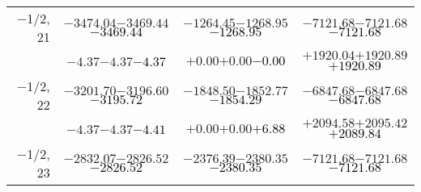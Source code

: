 \documentclass[compress]{beamer}
\begin{document}
\begin{frame}
{\begin{tabular}{r | c | c | c}
$-$1/2, 21 & $-3474.04$\hspace{0.1 cm}$-3469.44$\hspace{0.1 cm}\textcolor{black}{$-3469.44$} & $-1264.45$\hspace{0.1 cm}$-1268.95$\hspace{0.1 cm}\textcolor{black}{$-1268.95$} & $-7121.68$\hspace{0.1 cm}$-7121.68$\hspace{0.1 cm}\textcolor{black}{$-7121.68$} \\
           & $-4.37$\hspace{0.1 cm}$-4.37$\hspace{0.1 cm}\textcolor{black}{$-4.37$} & $+0.00$\hspace{0.1 cm}$+0.00$\hspace{0.1 cm}\textcolor{black}{$-0.00$} & $+1920.04$\hspace{0.1 cm}$+1920.89$\hspace{0.1 cm}\textcolor{black}{$+1920.89$} \\
$-$1/2, 22 & $-3201.70$\hspace{0.1 cm}$-3196.60$\hspace{0.1 cm}\textcolor{black}{$-3195.72$} & $-1848.50$\hspace{0.1 cm}$-1852.77$\hspace{0.1 cm}\textcolor{black}{$-1854.29$} & $-6847.68$\hspace{0.1 cm}$-6847.68$\hspace{0.1 cm}\textcolor{black}{$-6847.68$} \\
           & $-4.37$\hspace{0.1 cm}$-4.37$\hspace{0.1 cm}\textcolor{black}{$-4.41$} & $+0.00$\hspace{0.1 cm}$+0.00$\hspace{0.1 cm}\textcolor{black}{$+6.88$} & $+2094.58$\hspace{0.1 cm}$+2095.42$\hspace{0.1 cm}\textcolor{black}{$+2089.84$} \\
$-$1/2, 23 & $-2832.07$\hspace{0.1 cm}$-2826.52$\hspace{0.1 cm}\textcolor{black}{$-2826.52$} & $-2376.39$\hspace{0.1 cm}$-2380.35$\hspace{0.1 cm}\textcolor{black}{$-2380.35$} & $-7121.68$\hspace{0.1 cm}$-7121.68$\hspace{0.1 cm}\textcolor{black}{$-7121.68$} \\

\end{tabular}}
\end{frame}
\end{document}

